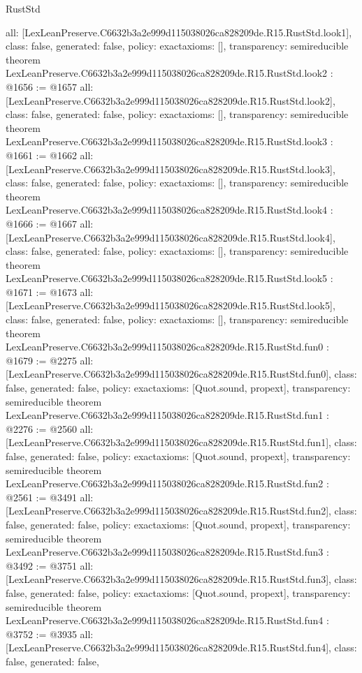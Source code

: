 \begin{lexlean}{RustStd}
\begin{coremodule}
{  all: [LexLeanPreserve.C6632b3a2e999d115038026ca828209de.R15.RustStd.look1],
  class: false,
  generated: false,
  policy: exact{axioms: []},
  transparency: semireducible
}
theorem LexLeanPreserve.C6632b3a2e999d115038026ca828209de.R15.RustStd.look2 : @1656 := @1657 {
  all: [LexLeanPreserve.C6632b3a2e999d115038026ca828209de.R15.RustStd.look2],
  class: false,
  generated: false,
  policy: exact{axioms: []},
  transparency: semireducible
}
theorem LexLeanPreserve.C6632b3a2e999d115038026ca828209de.R15.RustStd.look3 : @1661 := @1662 {
  all: [LexLeanPreserve.C6632b3a2e999d115038026ca828209de.R15.RustStd.look3],
  class: false,
  generated: false,
  policy: exact{axioms: []},
  transparency: semireducible
}
theorem LexLeanPreserve.C6632b3a2e999d115038026ca828209de.R15.RustStd.look4 : @1666 := @1667 {
  all: [LexLeanPreserve.C6632b3a2e999d115038026ca828209de.R15.RustStd.look4],
  class: false,
  generated: false,
  policy: exact{axioms: []},
  transparency: semireducible
}
theorem LexLeanPreserve.C6632b3a2e999d115038026ca828209de.R15.RustStd.look5 : @1671 := @1673 {
  all: [LexLeanPreserve.C6632b3a2e999d115038026ca828209de.R15.RustStd.look5],
  class: false,
  generated: false,
  policy: exact{axioms: []},
  transparency: semireducible
}
theorem LexLeanPreserve.C6632b3a2e999d115038026ca828209de.R15.RustStd.fun0 : @1679 := @2275 {
  all: [LexLeanPreserve.C6632b3a2e999d115038026ca828209de.R15.RustStd.fun0],
  class: false,
  generated: false,
  policy: exact{axioms: [Quot.sound, propext]},
  transparency: semireducible
}
theorem LexLeanPreserve.C6632b3a2e999d115038026ca828209de.R15.RustStd.fun1 : @2276 := @2560 {
  all: [LexLeanPreserve.C6632b3a2e999d115038026ca828209de.R15.RustStd.fun1],
  class: false,
  generated: false,
  policy: exact{axioms: [Quot.sound, propext]},
  transparency: semireducible
}
theorem LexLeanPreserve.C6632b3a2e999d115038026ca828209de.R15.RustStd.fun2 : @2561 := @3491 {
  all: [LexLeanPreserve.C6632b3a2e999d115038026ca828209de.R15.RustStd.fun2],
  class: false,
  generated: false,
  policy: exact{axioms: [Quot.sound, propext]},
  transparency: semireducible
}
theorem LexLeanPreserve.C6632b3a2e999d115038026ca828209de.R15.RustStd.fun3 : @3492 := @3751 {
  all: [LexLeanPreserve.C6632b3a2e999d115038026ca828209de.R15.RustStd.fun3],
  class: false,
  generated: false,
  policy: exact{axioms: [Quot.sound, propext]},
  transparency: semireducible
}
theorem LexLeanPreserve.C6632b3a2e999d115038026ca828209de.R15.RustStd.fun4 : @3752 := @3935 {
  all: [LexLeanPreserve.C6632b3a2e999d115038026ca828209de.R15.RustStd.fun4],
  class: false,
  generated: false,
}
\end{coremodule}
\end{lexlean}
